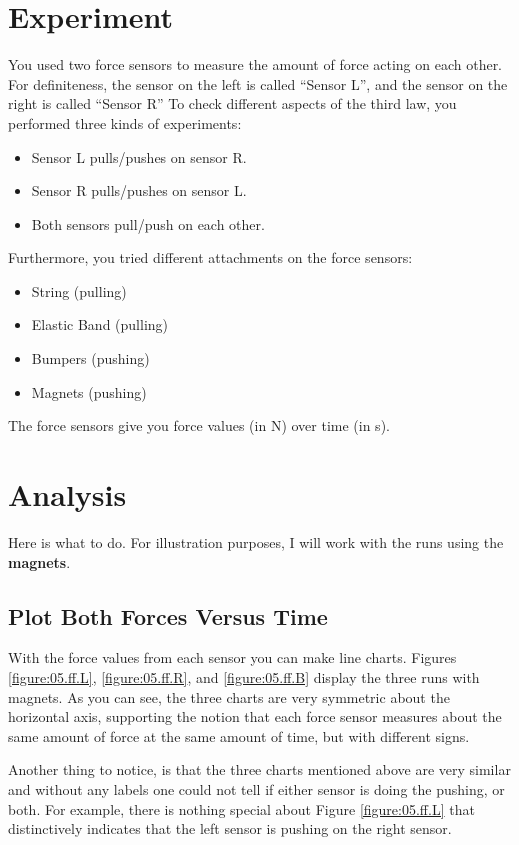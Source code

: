\section{Experiment}
%
You used two force sensors to measure the amount of force acting on each other. For definiteness, the sensor on the left is called ``Sensor L'', and the sensor on the right is called ``Sensor R'' To check different aspects of the third law, you performed three kinds of experiments:
\begin{itemize}
    \item Sensor L pulls/pushes on sensor R.
    \item Sensor R pulls/pushes on sensor L.
    \item Both sensors pull/push on each other.
\end{itemize}
Furthermore, you tried different attachments on the force sensors:
\begin{itemize}
    \item String (pulling)
    \item Elastic Band (pulling)
    \item Bumpers (pushing)
    \item Magnets (pushing)
\end{itemize}
The force sensors give you force values (in N) over time (in s).
%
\section{Analysis}
%
Here is what to do. For illustration purposes, I will work with the runs using the \textbf{magnets}.
%
\subsection{Plot Both Forces Versus Time}
%
With the force values from each sensor you can make line charts. Figures \ref{figure:05.ff.L}, \ref{figure:05.ff.R}, and \ref{figure:05.ff.B} display the three runs with magnets. As you can see, the three charts are very symmetric about the horizontal axis, supporting the notion that each force sensor measures about the same amount of force at the same amount of time, but with different signs.

Another thing to notice, is that the three charts mentioned above are very similar and without any labels one could not tell if either sensor is doing the pushing, or both. For example, there is nothing special about Figure \ref{figure:05.ff.L} that distinctively indicates that the left sensor is pushing on the right sensor.
%
